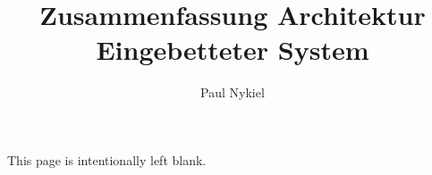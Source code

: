 \documentclass[10pt]{report}
\title{Zusammenfassung Architektur Eingebetteter System}
\author{Paul Nykiel}
\begin{document}
    \maketitle
    \pagebreak
    This page is intentionally left blank.
    \pagebreak
    \tableofcontents
    \pagebreak

    
    
    
    
    
\end{document}
